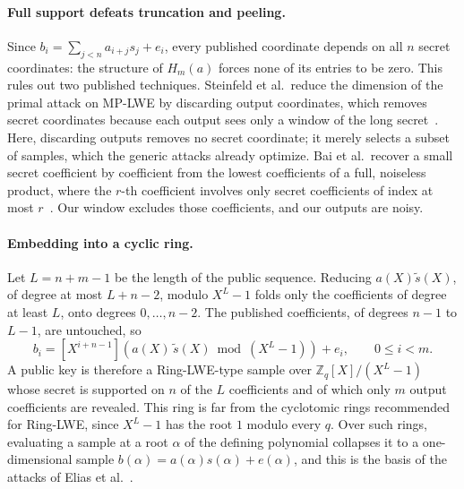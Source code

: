 \documentclass[11pt,a4paper]{article}
\theoremstyle{definition}
\newcommand{\Zq}{\mathbb{Z}_q}
\begin{document}
\paragraph{Full support defeats truncation and peeling.} Since $b_i = \sum_{j<n} a_{i+j} s_j + e_i$, every published coordinate depends on all $n$ secret coordinates: the structure of $H_m(a)$ forces none of its entries to be zero. This rules out two published techniques. Steinfeld et al.\ reduce the dimension of the primal attack on MP-LWE by discarding output coordinates, which removes secret coordinates because each output sees only a window of the long secret~\cite[Prop.~2]{ssz2019practical}. Here, discarding outputs removes no secret coordinate; it merely selects a subset of samples, which the generic attacks already optimize. Bai et al.\ recover a small secret coefficient by coefficient from the lowest coefficients of a full, noiseless product, where the $r$-th coefficient involves only secret coefficients of index at most $r$~\cite[Sect.~4]{bai2020mpsign}. Our window excludes those coefficients, and our outputs are noisy.

\paragraph{Embedding into a cyclic ring.} Let $L = n + m - 1$ be the length of the public sequence. Reducing $a(X)\tilde{s}(X)$, of degree at most $L + n - 2$, modulo $X^L - 1$ folds only the coefficients of degree at least $L$, onto degrees $0, \dots, n - 2$. The published coefficients, of degrees $n - 1$ to $L - 1$, are untouched, so
\[
b_i = [X^{i+n-1}] \left( a(X)\,\tilde{s}(X) \bmod (X^L - 1) \right) + e_i, \qquad 0 \le i < m.
\]
A public key is therefore a Ring-LWE-type sample over $\Zq[X]/(X^L - 1)$ whose secret is supported on $n$ of the $L$ coefficients and of which only $m$ output coefficients are revealed. This ring is far from the cyclotomic rings recommended for Ring-LWE, since $X^L - 1$ has the root $1$ modulo every $q$. Over such rings, evaluating a sample at a root $\alpha$ of the defining polynomial collapses it to a one-dimensional sample $b(\alpha) = a(\alpha)s(\alpha) + e(\alpha)$, and this is the basis of the attacks of Elias et al.~\cite{elos2015weak}.
\end{document}
